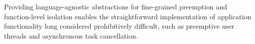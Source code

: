 Providing language-agnostic abstractions for fine-grained preemption and
function-level isolation enables the straightforward implementation of application
functionality long considered prohibitively difficult, such as preemptive user
threads and asynchronous task cancellation.
